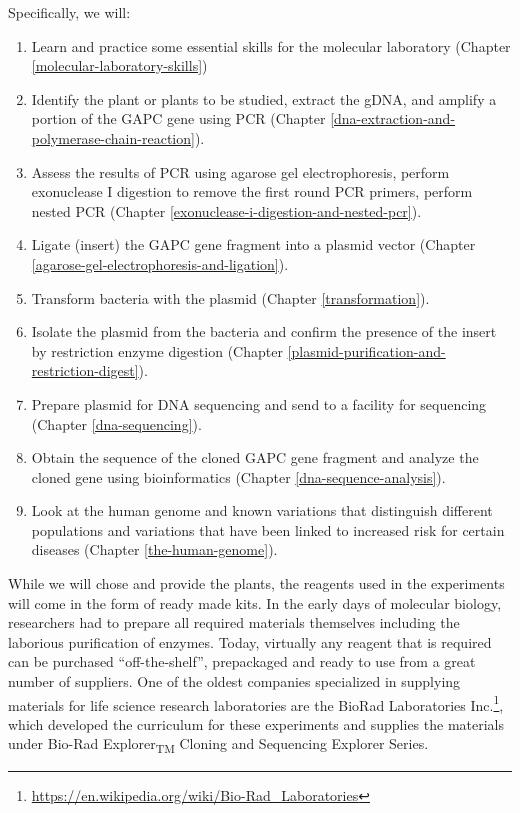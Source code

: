 \documentclass[]{book}
\providecommand{\tightlist}{%
  \setlength{\itemsep}{0pt}\setlength{\parskip}{0pt}}
\let\rmarkdownfootnote\footnote%
\def\footnote{\protect\rmarkdownfootnote}
\renewcommand{\href}[2]{#2\footnote{\url{#1}}}
\begin{document}
Specifically, we will:

\begin{enumerate}
\def\labelenumi{\arabic{enumi}.}
\tightlist
\item
  Learn and practice some essential skills for the molecular laboratory (Chapter \ref{molecular-laboratory-skills})
\item
  Identify the plant or plants to be studied, extract the gDNA, and amplify a portion of the GAPC gene using PCR (Chapter \ref{dna-extraction-and-polymerase-chain-reaction}).
\item
  Assess the results of PCR using agarose gel electrophoresis, perform exonuclease I digestion to remove the first round PCR primers, perform nested PCR (Chapter \ref{exonuclease-i-digestion-and-nested-pcr}).
\item
  Ligate (insert) the GAPC gene fragment into a plasmid vector (Chapter \ref{agarose-gel-electrophoresis-and-ligation}).
\item
  Transform bacteria with the plasmid (Chapter \ref{transformation}).
\item
  Isolate the plasmid from the bacteria and confirm the presence of the insert by restriction enzyme digestion (Chapter \ref{plasmid-purification-and-restriction-digest}).
\item
  Prepare plasmid for DNA sequencing and send to a facility for sequencing (Chapter \ref{dna-sequencing}).
\item
  Obtain the sequence of the cloned GAPC gene fragment and analyze the cloned gene using bioinformatics (Chapter \ref{dna-sequence-analysis}).
\item
  Look at the human genome and known variations that distinguish different populations and variations that have been linked to increased risk for certain diseases (Chapter \ref{the-human-genome}).
\end{enumerate}

While we will chose and provide the plants, the reagents used in the experiments will come in the form of ready made kits. In the early days of molecular biology, researchers had to prepare all required materials themselves including the laborious purification of enzymes. Today, virtually any reagent that is required can be purchased ``off-the-shelf'', prepackaged and ready to use from a great number of suppliers. One of the oldest companies specialized in supplying materials for life science research laboratories are the \href{https://en.wikipedia.org/wiki/Bio-Rad_Laboratories}{BioRad Laboratories Inc.}, which developed the curriculum for these experiments and supplies the materials under Bio-Rad Explorer\textsubscript{TM} Cloning and Sequencing Explorer Series.
\end{document}
